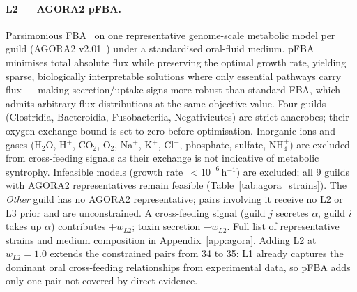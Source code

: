 \documentclass[11pt,a4paper]{article}
\begin{document}
\paragraph{L2 — AGORA2 pFBA.}
Parsimonious FBA~\citep{lewis2010} on one representative genome-scale metabolic model
per guild (AGORA2 v2.01~\citep{heinken2023}) under a standardised oral-fluid medium.
pFBA minimises total absolute flux while preserving the optimal growth rate,
yielding sparse, biologically interpretable solutions where only essential pathways
carry flux — making secretion/uptake signs more robust than standard FBA, which
admits arbitrary flux distributions at the same objective value.
Four guilds (Clostridia, Bacteroidia, Fusobacteriia, Negativicutes) are strict anaerobes;
their oxygen exchange bound is set to zero before optimisation.
Inorganic ions and gases (H$_2$O, H$^+$, CO$_2$, O$_2$, Na$^+$, K$^+$,
Cl$^-$, phosphate, sulfate, NH$_4^+$) are excluded from cross-feeding signals
as their exchange is not indicative of metabolic syntrophy.
Infeasible models (growth rate~$<10^{-6}$\,h$^{-1}$) are excluded; all 9 guilds
with AGORA2 representatives remain feasible (Table~\ref{tab:agora_strains}).
The \emph{Other} guild has no AGORA2 representative; pairs involving it receive no
L2 or L3 prior and are unconstrained.
A cross-feeding signal (guild $j$ secretes $\alpha$, guild $i$ takes up $\alpha$)
contributes $+w_{L2}$; toxin secretion $-w_{L2}$.
Full list of representative strains and medium composition in Appendix~\ref{app:agora}.
Adding L2 at $w_{L2}=1.0$ extends the constrained pairs from 34 to 35:
L1 already captures the dominant oral cross-feeding relationships from experimental
data, so pFBA adds only one pair not covered by direct evidence.
\end{document}
